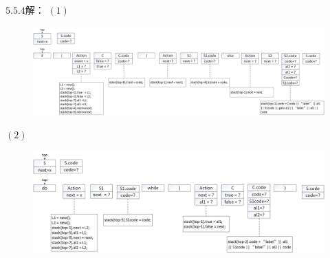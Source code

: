 \documentclass[UTF8,noindent]{ctexart}
\begin{document}
$5.5.4$解：
$(1)$
\begin{figure}[H]
  \centering
  \includegraphics[scale = 0.3]{./fig/5-5-4-a.jpg}
\end{figure}

$(2)$
\begin{figure}[H]
  \centering
  \includegraphics[scale = 0.3]{./fig/5-5-4-b.jpg}
\end{figure}
\end{document}
